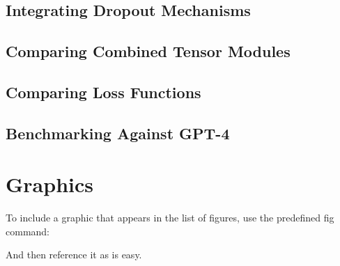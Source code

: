 \subsection{Integrating Dropout Mechanisms}
\label{subsec:5_integrating_dropout_mechanisms}
\subsection{Comparing Combined Tensor Modules}
\label{subsec:5_comparing_combined_tensor_modules}
\subsection{Comparing Loss Functions}
\label{subsec:5_comparing_loss_functions}
\subsection{Benchmarking Against GPT-4}
\label{subsec:5_benchmarking_against_gpt-4}

\section{Graphics}

To include a graphic that appears in the list of figures, use the predefined fig command:\\

And then reference it as  is easy.